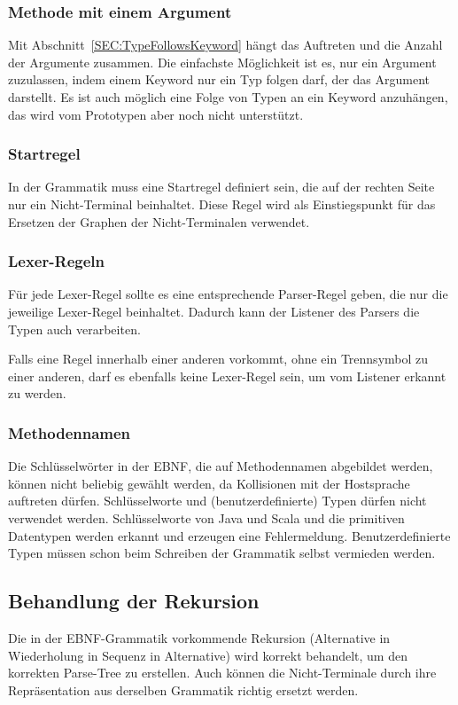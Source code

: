 \documentclass[../InterneDSLs.tex]{subfiles}
\begin{document}
\subsubsection{Methode mit einem Argument}
Mit Abschnitt~\ref{SEC:TypeFollowsKeyword} hängt das Auftreten und die Anzahl der Argumente zusammen. Die einfachste Möglichkeit ist es, nur ein Argument zuzulassen, indem einem Keyword nur ein Typ folgen darf, der das Argument darstellt. Es ist auch möglich eine Folge von Typen an ein Keyword anzuhängen, das wird vom Prototypen aber noch nicht unterstützt.

\subsubsection{Startregel}
In der Grammatik muss eine Startregel definiert sein, die auf der rechten Seite nur ein Nicht-Terminal beinhaltet. Diese Regel wird als Einstiegspunkt für das Ersetzen der Graphen der Nicht-Terminalen verwendet.

\subsubsection{Lexer-Regeln}
Für jede Lexer-Regel sollte es eine entsprechende Parser-Regel geben, die nur die jeweilige Lexer-Regel beinhaltet. Dadurch kann der Listener des Parsers die Typen auch verarbeiten.

Falls eine Regel innerhalb einer anderen vorkommt, ohne ein Trennsymbol zu einer anderen, darf es ebenfalls keine Lexer-Regel sein, um vom Listener erkannt zu werden.

\subsubsection{Methodennamen}
Die Schlüsselwörter in der EBNF, die auf Methodennamen abgebildet werden, können nicht beliebig gewählt werden, da Kollisionen mit der Hostsprache auftreten dürfen. Schlüsselworte und (benutzerdefinierte) Typen dürfen nicht verwendet werden. Schlüsselworte von Java und Scala und die primitiven Datentypen werden erkannt und erzeugen eine Fehlermeldung. Benutzerdefinierte Typen müssen schon beim Schreiben der Grammatik selbst vermieden werden.


\subsection{Behandlung der Rekursion}
Die in der EBNF-Grammatik vorkommende Rekursion (Alternative in Wiederholung in Sequenz in Alternative) wird korrekt behandelt, um den korrekten Parse-Tree zu erstellen. Auch können die Nicht-Terminale durch ihre Repräsentation aus derselben Grammatik richtig ersetzt werden.
\end{document}
